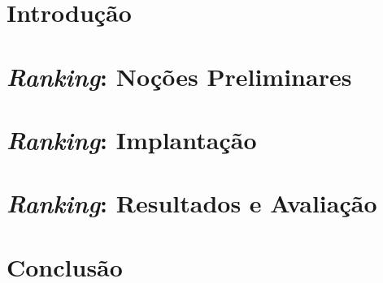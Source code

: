 \documentclass[12pt, a4paper, normaltoc, capchap, capsec, times]{abnt}
\begin{document}
\ProximoForaDoSumario
\listadetabelas


\chapter{Introdução}
\label{chap:introducao}


\chapter{\emph{Ranking}: Noções Preliminares}
\label{chap:nocoes_preliminares}


\chapter{\emph{Ranking}: Implantação}
\label{chap:implantacao}


\chapter{\emph{Ranking}: Resultados e Avaliação}
\label{chap:avaliacao}


\chapter{Conclusão}
\label{chap:conclusao}



\end{document}
